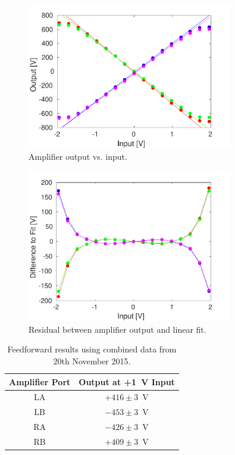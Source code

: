 \begin{figure}
  \centering
  \includegraphics[width=0.8\textwidth]{Figures/commissioning/AmpOutvsDAC}
  \caption{Amplifier output vs. input.}
  \label{f:AmpOutvsDAC}
\end{figure}

\begin{figure}
  \centering
  \includegraphics[width=0.8\textwidth]{Figures/commissioning/AmpOutvsDAC_residual}
  \caption{Residual between amplifier output and linear fit.}
  \label{f:AmpOutvsDAC_residual}
\end{figure}

\begin{table}
  \begin{center}
    \begin{tabular}{| c | c |}
	   \hline
       Amplifier Port & Output at +1~V Input \\ \hline
       LA & \(+416\pm3\)~V \\
	   LB & \(-453\pm3\)~V \\
	   RA & \(-426\pm3\)~V \\
	   RB & \(+409\pm3\)~V \\
 	   \hline
    \end{tabular}
    \caption{Feedforward results using combined data from 20th November 2015.}
  	\label{t:AmpOutVsDAC}
  \end{center}
\end{table}

